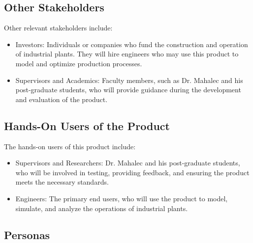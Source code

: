 \documentclass[12pt]{article}
\begin{document}
\subsection{Other Stakeholders} 
Other relevant stakeholders include: 
\begin{itemize} 
  \item Investors: Individuals or companies who fund the construction and operation of industrial plants. They will hire engineers who may use this product to model and optimize production processes. 
  \item Supervisors and Academics: Faculty members, such as Dr. Mahalec and his post-graduate students, who will provide guidance during the development and evaluation of the product. 
\end{itemize}

\subsection{Hands-On Users of the Product} 
The hands-on users of this product include: 
\begin{itemize} 
  \item Supervisors and Researchers: Dr. Mahalec and his post-graduate students, who will be involved in testing, providing feedback, and ensuring the product meets the necessary standards. 
  \item Engineers: The primary end users, who will use the product to model, simulate, and analyze the operations of industrial plants. 
\end{itemize}

\subsection{Personas}
\end{document}
